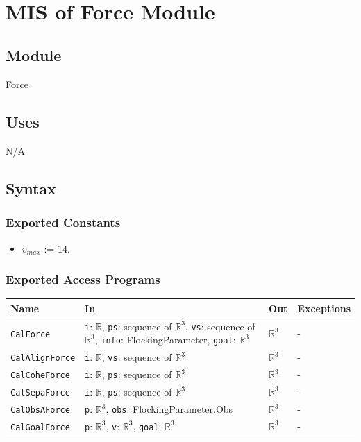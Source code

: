 \documentclass[12pt, titlepage]{article}
\begin{document}
~\newpage

\section{MIS of Force Module} \label{mForce}

\subsection{Module}

Force

\subsection{Uses}

N/A

\subsection{Syntax}

\subsubsection{Exported Constants}

\begin{itemize}
\item $v_{max}$ := 14.
\end{itemize}

\subsubsection{Exported Access Programs}

\begin{center}
\begin{tabular}{p{4cm} p{4cm} p{4cm} p{2cm}}
\hline
\textbf{Name} & \textbf{In} & \textbf{Out} & \textbf{Exceptions} \\
\hline
\texttt{CalForce} & \texttt{i}: $\mathbb{R}$, \texttt{ps}: sequence of $\mathbb{R}^3$, 
\texttt{vs}: sequence of $\mathbb{R}^3$, \texttt{info}: FlockingParameter, 
\texttt{goal}: $\mathbb{R}^3$ & $\mathbb{R}^3$ & - \\
\texttt{CalAlignForce} & \texttt{i}: $\mathbb{R}$, \texttt{vs}: sequence of $\mathbb{R}^3$ & $\mathbb{R}^3$ & - \\
\texttt{CalCoheForce} & \texttt{i}: $\mathbb{R}$, \texttt{ps}: sequence of $\mathbb{R}^3$ & $\mathbb{R}^3$ & - \\
\texttt{CalSepaForce} & \texttt{i}: $\mathbb{R}$, \texttt{ps}: sequence of $\mathbb{R}^3$ & $\mathbb{R}^3$ & - \\
\texttt{CalObsAForce} & \texttt{p}: $\mathbb{R}^3$, \texttt{obs}: FlockingParameter.Obs & $\mathbb{R}^3$ & - \\
\texttt{CalGoalForce} & \texttt{p}: $\mathbb{R}^3$, \texttt{v}: $\mathbb{R}^3$, \texttt{goal}: $\mathbb{R}^3$ & $\mathbb{R}^3$ & - \\
\hline
\end{tabular}
\end{center}
\end{document}
